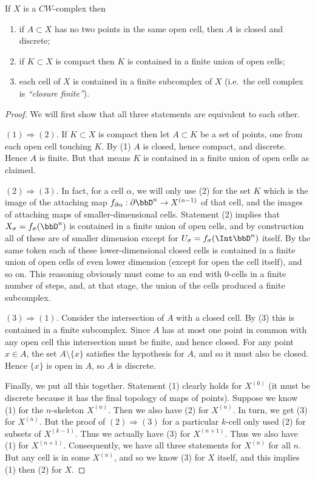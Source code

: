 \begin{prop}\label{prop 8.1 Bredon}
    If $X$ is a $CW$-complex then
    \begin{enumerate}
        \item if $A\subset X$ has no two points in the same open cell, then $A$ is closed and discrete;
        \item if $K\subset X$ is compact then $K$ is contained in a finite union of open cells;
        \item each cell of $X$ is contained in a finite subcomplex of $X$ (i.e.\ the cell complex is \emph{``closure finite''}).
    \end{enumerate}
\end{prop}
\begin{proof}
    We will first show that all three statements are equivalent to each other.
    
    $(1)\Rightarrow (2)$. If $K\subset X$ is compact then let $A\subset K$ be a set of points, one from each open cell touching $K$. By (1) $A$ is closed, hence compact, and discrete. Hence $A$ is finite. But that means $K$ is contained in a finite union of open cells as claimed.

    $(2)\Rightarrow(3)$. In fact, for a cell $\alpha$, we will only use (2) for the set $K$ which is the image of the attaching map $f_{\partial \alpha}:\partial \bbD^n\to X^{(n-1)}$ of that cell, and the images of attaching maps of smaller-dimensional cells. Statement (2) implies that $X_\sigma=f_\sigma(\bbD^n)$ is contained in a finite union of open cells, and by construction all of these are of smaller dimension except for $U_\sigma=f_\sigma(\Int \bbD^n)$ itself. By the same token each of these lower-dimensional closed cells is contained in a finite union of open cells of even lower dimension (except for open the cell itself), and so on. This reasoning obviously must come to an end with $0$-cells in a finite number of steps, and, at that stage, the union of the cells produced a finite subcomplex.

    $(3)\Rightarrow(1)$. Consider the intersection of $A$ with a closed cell. By (3) this is contained in a finite subcomplex. Since $A$ has at most one point in common with any open cell this intersection must be finite, and hence closed. For any point $x\in A$, the set $A\setminus\{x\}$ satisfies the hypothesis for $A$, and so it must also be closed. Hence $\{x\}$ is open in $A$, so $A$ is discrete.

    Finally, we put all this together. Statement (1) clearly holds for $X^{(0)}$ (it must be discrete because it has the final topology of maps of points). Suppose we know (1) for the $n$-skeleton $X^{(n)}$. Then we also have (2) for $X^{(n)}$. In turn, we get (3) for $X^{(n)}$. But the proof of $(2)\Rightarrow(3)$ for a particular $k$-cell only used (2) for subsets of $X^{(k-1)}$. Thus we actually have (3) for $X^{(n+1)}$. Thus we also have (1) for $X^{(n+1)}$. Consequently, we have all three statements for $X^{(n)}$ for all $n$. But any cell is in some $X^{(n)}$, and so we know (3) for $X$ itself, and this implies (1) then (2) for $X$.
\end{proof} 
